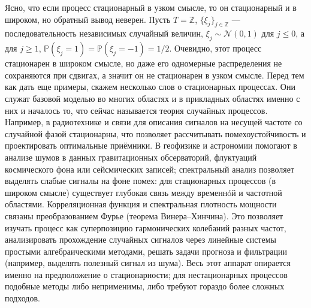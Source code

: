 \documentclass[10pt]{article}
\theoremstyle{boldnormal}
\newcommand{\Z}{{\ensuremath{\mathbb{Z}}}}
\newcommand{\PP}{{\ensuremath{\mathbb{P}}}}
\theoremstyle{boldremark}
\newenvironment{example}
  {\pushQED{\qed}\renewcommand{\qedsymbol}{$\triangle$}\examplex}
  {\popQED\endexamplex}
\begin{document}
Ясно, что если процесс стационарный в узком смысле, то он стационарный и
в широком, но обратный вывод неверен.
\begin{example}\label{example:weakbutnotstrongsp}
Пусть \(T=\Z\), \(\{\xi_j\}_{j\in \Z}\) --- последовательность 
независимых случайный величин, \(\xi_j\sim \mathcal{N}(0,1)\) 
для \(j\leq 0\), а для \(j\geq 1\), \(\PP(\xi_j=1)=\PP(\xi_j=-1)=1/2\).
Очевидно, этот процесс стационарен в широком смысле, но даже его 
одномерные распределения не сохраняются при сдвигах, а значит 
он не стационарен в узком смысле.
\end{example}
Перед тем как дать еще примеры, скажем несколько слов о стационарных процессах.
Они служат базовой моделью во многих областях и 
в прикладных областях именно 
с них и началось то, что сейчас называется теория случайных процессов.
Например, в радиотехнике и связи
для описания сигналов на несущей частоте со случайной фазой
стационарны, что позволяет рассчитывать помехоустойчивость
и проектировать оптимальные приёмники. В геофизике и астрономии
помогают в анализе шумов в данных гравитационных обсерваторий,
флуктуаций космического фона или сейсмических
записей; спектральный анализ позволяет выделять слабые сигналы на фоне помех:
для стационарных процессов (в широком смысле) существует
глубокая связь между временн\'oй и частотной областями.
Корреляционная функция и спектральная плотность
мощности связаны преобразованием Фурье (теорема Винера–Хинчина). Это позволяет
изучать процесс как суперпозицию гармонических колебаний разных частот,
анализировать прохождение случайных сигналов через линейные системы
простыми алгебраическими методами,
решать задачи прогноза и фильтрации (например, выделять полезный сигнал из шума).
Весь этот аппарат опирается именно на предположение о стационарности;
для нестационарных процессов подобные методы либо неприменимы,
либо требуют гораздо более сложных подходов.
\end{document}
